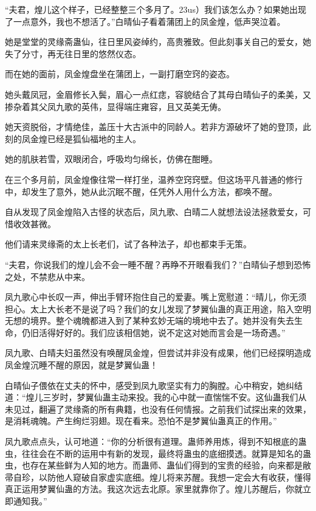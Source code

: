 
\begin{this_body}

“夫君，煌儿这个样子，已经整整三个多月了。23us）我们该怎么办？如果她出现了一点意外，我也不想活了。”白晴仙子看着蒲团上的凤金煌，低声哭泣着。

她是堂堂的灵缘斋蛊仙，往日里风姿绰约，高贵雅致。但此刻事关自己的爱女，她失了分寸，再无往日里的悠然仪态。

而在她的面前，凤金煌盘坐在蒲团上，一副打磨空窍的姿态。

她头戴凤冠，金眉修长入鬓，眉心一点红痣，容貌结合了其母白晴仙子的柔美，又掺杂着其父凤九歌的英伟，显得端庄雍容，且又英美无俦。

她天资脱俗，才情绝佳，盖压十大古派中的同龄人。若非方源破坏了她的登顶，此刻的凤金煌已经是狐仙福地的主人。

她的肌肤若雪，双眼闭合，呼吸均匀绵长，仿佛在酣睡。

在三个多月前，凤金煌像往常一样打坐，温养空窍窍壁。但这场平凡普通的修行中，却发生了意外，她从此沉眠不醒，任凭外人用什么方法，都唤不醒。

自从发现了凤金煌陷入古怪的状态后，凤九歌、白晴二人就想法设法拯救爱女，可惜收效甚微。

他们请来灵缘斋的太上长老们，试了各种法子，却也都束手无策。

“夫君，你说我们的煌儿会不会一睡不醒？再睁不开眼看我们？”白晴仙子想到恐怖之处，不禁悲从中来。

凤九歌心中长叹一声，伸出手臂环抱住自己的爱妻。嘴上宽慰道：“晴儿，你无须担心。太上大长老不是说了吗？我们的女儿发现了梦翼仙蛊的真正用途，陷入空明无想的境界。整个魂魄都进入到了某种玄妙无端的境地中去了。她并没有失去生命，仍旧活得好好的。我们应该相信她，说不定这对她而言会是一场奇遇。”

凤九歌、白晴夫妇虽然没有唤醒凤金煌，但尝试并非没有成果，他们已经探明造成凤金煌沉睡不醒的原因，就是梦翼仙蛊！

白晴仙子偎依在丈夫的怀中，感受到凤九歌坚实有力的胸膛。心中稍安，她纠结道：“煌儿三岁时，梦翼仙蛊主动来投。我的心中就一直惴惴不安。这仙蛊我们从未见过，翻遍了灵缘斋的所有典籍，也没有任何情报。之前我们试探出来的效果，是消耗魂魄。产生绚烂羽翅。现在看来。恐怕不是梦翼仙蛊真正的作用。”

凤九歌点点头，认可地道：“你的分析很有道理。蛊师养用炼，得到不知根底的蛊虫，往往会在不断的运用中有新的发现，最终将蛊虫的底细摸透。就算是知名的蛊虫，也存在某些鲜为人知的地方。而蛊师、蛊仙们得到的宝贵的经验，向来都是敝帚自珍，以防他人窥破自家虚实底细。煌儿将来苏醒。我想一定会大有收获，懂得真正运用梦翼仙蛊的方法。我这次远去北原。家里就靠你了。煌儿苏醒后，你就立即通知我。”


\end{this_body}
